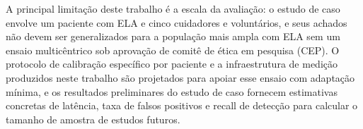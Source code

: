 A principal limitação deste trabalho é a escala da avaliação: o estudo de caso envolve
um paciente com ELA e cinco cuidadores e voluntários, e seus achados não devem ser
generalizados para a população mais ampla com ELA sem um ensaio multicêntrico sob
aprovação de comitê de ética em pesquisa (CEP). O protocolo de calibração
específico por paciente e a infraestrutura de medição produzidos neste trabalho são
projetados para apoiar esse ensaio com adaptação mínima, e os resultados preliminares
do estudo de caso fornecem estimativas concretas de latência, taxa de falsos positivos
e recall de detecção para calcular o tamanho de amostra de estudos futuros.
